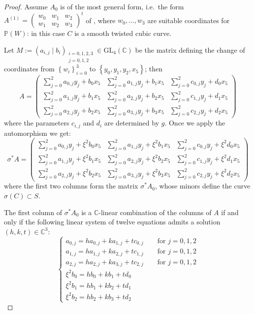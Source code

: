 \documentclass{amsart}
\theoremstyle{definition}
\newcommand{\coloneqq}{:=}
\begin{document}
\begin{proof}
Assume $A_0$ is of the most general form, i.e.\ the form $A^{(1)} = \begin{pmatrix}w_0 & w_1 & w_2 \\ w_1 & w_2 & w_3
\end{pmatrix}^t$ of \cite[\S 1]{llsvs}, where $w_0, \dots, w_3$ are suitable coordinates for $\mathbb{P}(W)$: in this case $C$ is a smooth twisted cubic curve.

Let $M \coloneqq \left(a_{i,j} \mid b_i \right)_{\substack{i=0,1,2, 3 \\ j=0,1,2}} \in \textrm{GL}_4(\mathbb{C})$ be the matrix defining the change of coordinates from $\left\{ w_i \right\}_{i=0}^3$ to $\left\{ y_0, y_1, y_2, x_5 \right\}$; then
\[
\renewcommand{\arraystretch}{1.5}
A = \left( \begin{array}{cc|c}
\sum_{j=0}^2 a_{0,j}y_j + b_0 x_5 & \sum_{j=0}^2 a_{1,j}y_j + b_1 x_5 & \sum_{j=0}^2 c_{0,j}y_j + d_0 x_5 \\
\sum_{j=0}^2 a_{1,j}y_j + b_1 x_5 & \sum_{j=0}^2 a_{2,j}y_j + b_2 x_5 & \sum_{j=0}^2 c_{1,j}y_j + d_1 x_5 \\
\sum_{j=0}^2 a_{2,j}y_j + b_2 x_5 & \sum_{j=0}^2 a_{3,j}y_j + b_3 x_5 & \sum_{j=0}^2 c_{2,j}y_j + d_2 x_5
\end{array} \right) \]
\noindent where the parameters $c_{i,j}$ and $d_i$ are determined by $g$. Once we apply the automorphism we get:
\[
\renewcommand{\arraystretch}{1.5}
\sigma^* A = \left( \begin{array}{cc|c}
\sum_{j=0}^2 a_{0,j}y_j + \xi^2 b_0 x_5 & \sum_{j=0}^2 a_{1,j}y_j + \xi^2 b_1 x_5 & \sum_{j=0}^2 c_{0,j}y_j + \xi^2 d_0  x_5 \\
\sum_{j=0}^2 a_{1,j}y_j + \xi^2 b_1 x_5 & \sum_{j=0}^2 a_{2,j}y_j +\xi^2  b_2 x_5 & \sum_{j=0}^2 c_{1,j}y_j + \xi^2 d_1 x_5 \\
\sum_{j=0}^2 a_{2,j}y_j + \xi^2 b_2 x_5 & \sum_{j=0}^2 a_{3,j}y_j + \xi^2 b_3 x_5 & \sum_{j=0}^2 c_{2,j}y_j + \xi^2 d_2 x_5
\end{array} \right) \]
\noindent where the first two columns form the matrix $\sigma^* A_0$, whose minors define the curve $\sigma(C) \subset S$.

The first column of $\sigma^* A_0$ is a $\mathbb{C}$-linear combination of the columns of $A$ if and only if the following linear system of twelve equations admits a solution $(h,k,t) \in \mathbb{C}^3$:
\begin{equation}\label{sistema equazioni llsvs}
\begin{cases}
a_{0,j} = h a_{0,j} + k a_{1,j} + t c_{0,j} \qquad \text{for } j=0,1,2\\
a_{1,j} = h a_{1,j} + k a_{2,j} + t c_{1,j} \qquad \text{for } j=0,1,2\\
a_{2,j} = h a_{2,j} + k a_{3,j} + t c_{2,j} \qquad \text{for } j=0,1,2\\
\xi^2 b_0 = h b_0 + k b_1 + t d_0 \\
\xi^2 b_1 = h b_1 + k b_2 + t d_1 \\
\xi^2 b_2 = h b_2 + k b_3 + t d_2 
\end{cases}
\end{equation}


\end{proof}
\end{document}
